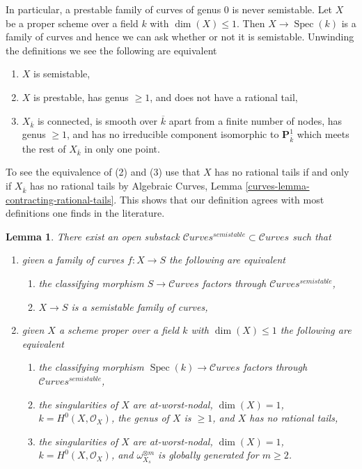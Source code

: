 \documentclass{stacks-project}
\theoremstyle{plain}
\newtheorem{lemma}[subsection]{Lemma}
\theoremstyle{definition}
\theoremstyle{remark}
\numberwithin{equation}{subsection}
\def\Spec{\mathop{\mathrm{Spec}}}
\def\Curvesstack{\mathcal{C}\!\mathit{urves}}
\begin{document}
\noindent
In particular, a prestable family of curves of genus $0$ is never
semistable.
Let $X$ be a proper scheme over a field $k$ with $\dim(X) \leq 1$.
Then $X \to \Spec(k)$ is a family of curves and hence we can ask
whether or not it is semistable. Unwinding the definitions we see
the following are equivalent
\begin{enumerate}
\item $X$ is semistable,
\item $X$ is prestable, has genus $\geq 1$, and does not have a rational tail,
\item $X_{\overline{k}}$ is connected, is smooth over $\overline{k}$
apart from a finite number of nodes, has genus $\geq 1$, and has no
irreducible component isomorphic to $\mathbf{P}^1_{\overline{k}}$
which meets the rest of $X_{\overline{k}}$ in only one point.
\end{enumerate}
To see the equivalence of (2) and (3) use that $X$ has no rational tails
if and only if $X_{\overline{k}}$ has no rational tails by
Algebraic Curves, Lemma \ref{curves-lemma-contracting-rational-tails}.
This shows that our definition agrees with most definitions one finds
in the literature.

\begin{lemma}
\label{lemma-semistable-curves}
There exist an open substack $\Curvesstack^{semistable} \subset \Curvesstack$
such that
\begin{enumerate}
\item given a family of curves $f : X \to S$ the following are equivalent
\begin{enumerate}
\item the classifying morphism $S \to \Curvesstack$ factors
through $\Curvesstack^{semistable}$,
\item $X \to S$ is a semistable family of curves,
\end{enumerate}
\item given $X$ a scheme proper over a field $k$ with
$\dim(X) \leq 1$ the following are equivalent
\begin{enumerate}
\item the classifying morphism $\Spec(k) \to \Curvesstack$
factors through $\Curvesstack^{semistable}$,
\item the singularities of $X$ are at-worst-nodal, $\dim(X) = 1$,
$k = H^0(X, \mathcal{O}_X)$, the genus of $X$ is $\geq 1$, and
$X$ has no rational tails,
\item the singularities of $X$ are at-worst-nodal, $\dim(X) = 1$,
$k = H^0(X, \mathcal{O}_X)$, and $\omega_{X_s}^{\otimes m}$ is
globally generated for $m \geq 2$.
\end{enumerate}
\end{enumerate}
\end{lemma}
\end{document}

